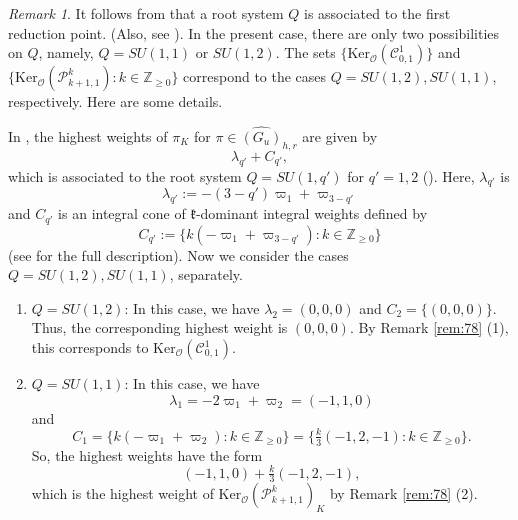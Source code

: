 \documentclass[reqno,11pt]{amsart}
\theoremstyle{remark}
\newtheorem{rem}[equation]{Remark}
\numberwithin{equation}{section}
\newcommand{\fk}{{\mathfrak k}}
\newcommand{\Z}{\mathbb{Z}}
\newcommand{\Cal}{\mathcal}
\newcommand{\Ker}{\mathrm{Ker}}
\begin{document}
\begin{rem}
It follows from \cite{EHW83} that 
a root system $Q$ is associated to the first reduction point.
(Also, see \cite[Table 6.22]{DES90}).
In the present case, there are only two possibilities on $Q$, 
namely, $Q=SU(1,1)$ or $SU(1,2)$.
The sets $\{ \Ker_{\Cal{O}}(\Cal{C}^{1}_{0,1})\}$ 
and $\{ \Ker_{\Cal{O}}(\Cal{P}^{k}_{k+1,1}):k \in \Z_{\geq 0}\}$
correspond to the cases $Q=SU(1,2), SU(1,1)$, respectively. 
Here are some details.

In \cite{DES90}, the highest weights of $\pi_K$
for $\pi \in \widehat{(G_u)}_{h,r}$ are given by 
\begin{equation*}
\lambda_{q'} + C_{q'},
\end{equation*}
which is associated to the root system $Q=SU(1,q')$ for $q'=1,2$
(\cite[Def.\ 6.5 and Prop.\ 6.6]{DES90}).
Here, $\lambda_{q'}$ is 
\begin{equation*}
\lambda_{q'}:=-(3-q')\varpi_1+\varpi_{3-q'}
\end{equation*}
and $C_{q'}$ is an integral cone of $\fk$-dominant integral weights defined by
\begin{equation*}
C_{q'}:=\{k (-\varpi_1 + \varpi_{3-q'}): k \in \Z_{\geq 0}\}
\end{equation*}
(see \cite[Tables 6.21 and 6.22]{DES90} for the full description). 
Now we consider the cases $Q=SU(1,2), SU(1,1)$, separately.

\begin{enumerate}[(1)]

\item $Q=SU(1,2)$: In this case, we have $\lambda_2=(0,0,0)$ and $C_2=\{(0,0,0)\}$. Thus,
the corresponding highest weight is $(0,0,0)$. By Remark \ref{rem:78} (1),
this corresponds to $\Ker_{\Cal{O}}(\Cal{C}^{1}_{0,1})$.

\vskip 0.1in

\item $Q=SU(1,1)$: In this case, we have 
\begin{equation*}
\lambda_1=-2\varpi_1+\varpi_2=(-1,1,0)
\end{equation*}
and 
\begin{equation*}
C_1=\{k(-\varpi_1+\varpi_2):k\in \Z_{\geq 0}\}=\{\tfrac{k}{3}(-1,2,-1):k\in \Z_{\geq 0}\}.
\end{equation*}
So, the highest weights have the form
\begin{equation*}
(-1,1,0)+\tfrac{k}{3}(-1,2,-1),
\end{equation*}
which is the highest weight of $\Ker_{\Cal{O}}(\Cal{P}^{k}_{k+1,1})_K$ by Remark \ref{rem:78} (2).

\end{enumerate}
\end{rem}
\end{document}
